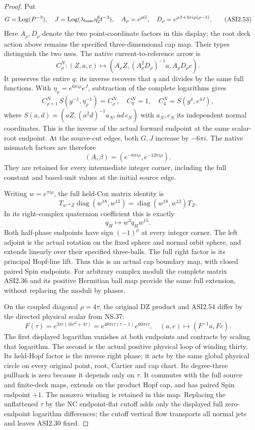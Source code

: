 \begin{proof}
Put
\[
 G=\operatorname{Log}(P^{-3}),\quad
 J=\operatorname{Log}(\lambda_{\rm base}\eta_2^6t^{-3}),
 \quad
 A_\rho=e^{\rho G},\quad
 D_\rho=e^{\rho J+3\pi i\rho(\rho-1)}.
 \tag{ASI2.53}
\]
Here \(A_\rho,D_\rho\) denote the two point-coordinate
factors in this display; the root deck action
above remains the specified three-dimensional
cap map. Their types distinguish the two
uses. The native current-to-reference arrow is
\[
 C_\rho^N:(Z,a,c)\mapsto
      (A_\rho Z,(A_\rho^2D_\rho)^{-1}a,
                                  A_\rho D_\rho c).
 \tag{ASI2.54}
\]
It preserves the entire \(q\); its inverse
recovers that \(q\) and divides by the same
full functions. With
\(\eta_\rho=e^{6\pi i\rho}e^J\), subtraction
of the complete logarithms gives
\[
 C_{\rho+1}^N\,S(g^{-1},\eta_\rho^{-1})=C_\rho^N,
 \quad C_0^N=1,\quad C_4^N=S(g^4,e^{4J}),
 \tag{ASI2.55}
\]
where \(S(a,d)=(aZ,(a^2d)^{-1}a_N,ad\,c_N)\)
with \(a_N,c_N\) its independent normal
coordinates. This is the inverse of the
actual forward endpoint at the same
scalar-root endpoint. At the source-cut
edges, both \(G,J\) increase by \(-6\pi i\).
The native mismatch factors are therefore
\[
          (A,\beta)=(e^{-6\pi i\rho},e^{-12\pi i\rho}).
 \tag{ASI2.56}
\]
They are retained for every intermediate
integer corner, including the full
constant and based-unit values at the
initial source edge.

Writing \(w=e^{\pi i\rho}\), the full
held-Cox matrix identity is
\[
 T_{w^{-6}Z}\operatorname{diag}(w^{18},w^{12})
       =\operatorname{diag}(w^{18},w^{12})T_Z.
 \tag{ASI2.57}
\]
In its right-complex quaternion coefficient
this is exactly
\[
                         q_H\mapsto w^3q_Hw^{15}.
 \tag{ASI2.58}
\]
Both half-phase endpoints have sign
\((-1)^\rho\) at every integer corner.
The left adjoint is the actual rotation
on the fixed sphere and normal orbit
sphere, and extends linearly over their
specified three-balls. The full right
factor is its principal Hopf-line lift.
Thus this is an actual cap boundary map,
with closed paired Spin endpoints.
For arbitrary complex moduli the complete
matrix ASI2.36 and its positive Hermitian
ball map provide the same full extension,
without replacing the moduli by phases.

On the coupled diagonal \(\rho=4\tau\),
the original DZ product and ASI2.54
differ by the directed physical scalar
from NS.37:
\[
 F(\tau)=e^{3\pi i(16\tau^2+4\tau)}
       =e^{48\pi i\tau(\tau-1)}e^{60\pi i\tau},
 \quad(a,c)\mapsto(F^{-1}a,Fc).
 \tag{ASI2.59}
\]
The first displayed logarithm vanishes at
both endpoints and contracts by scaling
that logarithm. The second is the actual
positive physical loop of winding thirty.
Its held-Hopf factor is the inverse right
phase; it acts by the same global physical
circle on every original point, root,
Cartier and cap chart. Its degree-three
pullback is zero because it depends only
on \(\tau\). It commutes with the full
source and finite-deck maps, extends on
the product Hopf cap, and has paired
Spin endpoint \(+1\). The nonzero winding
is retained in this map. Replacing the
unflattened \(\tau\) by the NC endpoint-flat
cutoff adds only the displayed full
zero-endpoint logarithm differences;
the cutoff vertical flow transports all
normal jets and leaves ASI2.30 fixed.


\end{proof}
